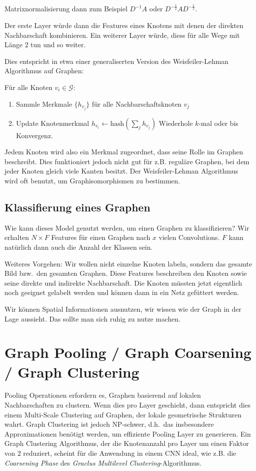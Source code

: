 \documentclass{scrartcl}
\begin{document}
Matrixnormalisierung dann zum Beispiel $D^{-1}A$ oder $D^{-\frac{1}{2}}AD^{-\frac{1}{2}}$.

Der erste Layer würde dann die Features eines Knotens mit denen der direkten Nachbarschaft kombinieren.
Ein weiterer Layer würde, diess für alle Wege mit Länge $2$ tun und so weiter.

Dies entspricht in etwa einer generaliserten Version des Weisfeiler-Lehman Algorithmus auf Graphen:

Für alle Knoten $v_i \in \mathcal{G}$:
\begin{enumerate}
  \item Sammle Merkmale $\lbrace h_{v_j} \rbrace$ für alle Nachbarschaftsknoten ${ v_j }$
  \item Update Knotenmerkmal $h_{v_i} \leftarrow \text{hash}(\sum_j h_{v_j})$
Wiederhole $k$-mal oder bis Konvergenz.
\end{enumerate}

Jedem Knoten wird also ein Merkmal zugeordnet, dass seine Rolle im Graphen beschreibt.
Dies funktioniert jedoch nicht gut für z.B. reguläre Graphen, bei dem jeder Knoten gleich viele Kanten besitzt.
Der Weisfeiler-Lehman Algorithmus wird oft benutzt, um Graphisomorphismen zu bestimmen.

\subsection{Klassifierung eines Graphen}

Wie kann dieses Model genutzt werden, um einen Graphen zu klassifizieren?
Wir erhalten $N \times F$ Features für einen Graphen nach $x$ vielen Convolutions.
$F$ kann natürlich dann auch die Anzahl der Klassen sein.

Weiteres Vorgehen:
Wir wollen nicht einzelne Knoten labeln, sondern das gesamte Bild bzw.\ den gesamten Graphen.
Diese Features beschreiben den Knoten sowie seine direkte und indirekte Nachbarschaft.
Die Knoten müssten jetzt eigentlich noch geeignet gelabelt werden und können dann in ein Netz gefüttert werden.

Wir können Spatial Informationen ausnutzen, wir wissen wie der Graph in der Lage aussieht.
Das sollte man sich ruhig zu nutze machen.

\section{Graph Pooling / Graph Coarsening / Graph Clustering}

Pooling Operationen erfordern es, Graphen basierend auf lokalen Nachbarschaften zu clustern.
Wenn dies pro Layer geschieht, dann entspricht dies einem Multi-Scale Clustering auf Graphen, der lokale geometrische Strukturen wahrt.
Graph Clustering ist jedoch NP-schwer, d.h.\ das insbesondere Approximationen benötigt werden, um effiziente Pooling Layer zu generieren.
Ein Graph Clustering Algorithmus, der die Knotenanzahl pro Layer um einen Faktor von $2$ reduziert, scheint für die Anwendung in einem CNN ideal, wie z.B. die \emph{Coarsening Phase} des \emph{Graclus Multilevel Clustering}-Algorithmus.
\end{document}
